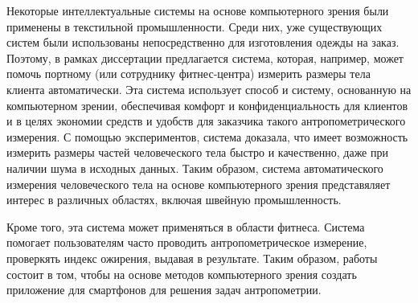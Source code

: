 Некоторые интеллектуальные системы на основе компьютерного зрения были применены в текстильной промышленности. Среди них, уже существующих систем были использованы непосредственно для изготовления одежды на заказ. Поэтому, в рамках диссертации предлагается система, которая, например, может помочь портному (или сотруднику фитнес-центра) измерить размеры тела клиента автоматически. Эта система использует способ и систему, основанную на  компьютерном зрении, обеспечивая комфорт и конфиденциальность для клиентов и в целях экономии средств и удобств для заказчика такого антропометрического измерения. С помощью экспериментов, система доказала, что имеет возможность измерить размеры частей человеческого тела быстро и качественно, даже при наличии шума в исходных данных. Таким образом, система автоматического измерения человеческого тела на основе компьютерного зрения представяляет интерес в различных областях, включая швейную промышленность.

Кроме того, эта система может применяться в области фитнеса. Система помогает пользователям часто проводить антропометрическое измерение, проверкять индекс ожирения, выдавая в результате. Таким образом, работы состоит в том, чтобы на основе методов компьютерного зрения создать приложение для смартфонов для решения задач антропометрии.